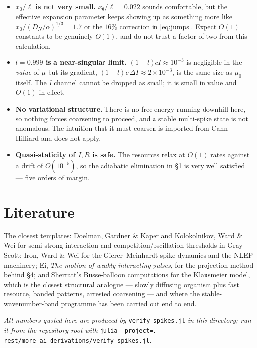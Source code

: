 \documentclass[11pt,a4paper]{article}
\theoremstyle{plain}
\theoremstyle{remark}
\begin{document}
\begin{itemize}
\item \textbf{$x_0/\ell$ is not very small.} $x_0/\ell = 0.022$ sounds
      comfortable, but the effective expansion parameter keeps showing up as
      something more like $x_0/(D_N/\alpha)^{1/3} = 1.7$ or the $16\%$ correction
      in \eqref{eq:jumps}. Expect $O(1)$ constants to be genuinely $O(1)$, and
      do not trust a factor of two from this calculation.
\item \textbf{$l = 0.999$ is a near-singular limit.} $(1-l)cI \approx 10^{-3}$ is
      negligible in the \emph{value} of $\mu$ but its gradient,
      $(1-l)c\,\Delta I \approx 2\times10^{-3}$, is the same size as $\mu_0$
      itself. The $I$ channel cannot be dropped as small; it is small in value
      and $O(1)$ in effect.
\item \textbf{No variational structure.} There is no free energy running
      downhill here, so nothing forces coarsening to proceed, and a stable
      multi-spike state is not anomalous. The intuition that it must coarsen is
      imported from Cahn--Hilliard and does not apply.
\item \textbf{Quasi-staticity of $I,R$ is safe.} The resources relax at $O(1)$
      rates against a drift of $O(10^{-5})$, so the adiabatic elimination in \S1
      is very well satisfied --- five orders of margin.
\end{itemize}

\section*{Literature}

The closest templates: Doelman, Gardner \& Kaper and Kolokolnikov, Ward \& Wei
for semi-strong interaction and competition/oscillation thresholds in
Gray--Scott; Iron, Ward \& Wei for the Gierer--Meinhardt spike dynamics and the
NLEP machinery; Ei, \emph{The motion of weakly interacting pulses}, for the
projection method behind \S4; and Sherratt's Busse-balloon computations for the
Klausmeier model, which is the closest structural analogue --- slowly diffusing
organism plus fast resource, banded patterns, arrested coarsening --- and where
the stable-wavenumber-band programme has been carried out end to end.

\bigskip
\noindent\emph{All numbers quoted here are produced by} \texttt{verify\_spikes.jl}
\emph{in this directory; run it from the repository root with}
\texttt{julia --project=. rest/more\_ai\_derivations/verify\_spikes.jl}.
\end{document}
